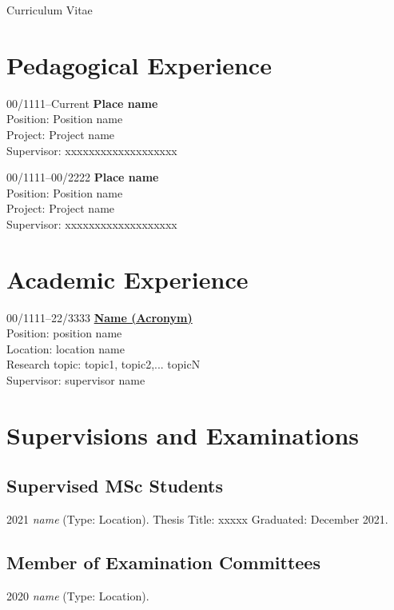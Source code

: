 \documentclass[11pt,a4paper]{article}
\begin{document}
\begin{cv}{Curriculum Vitae}
 \section{Pedagogical Experience}
  \begin{cvlist}{}
      \item[00/1111--Current]
      {\textbf{Place name}}\\
      {Position:} Position name\\
      {Project:} Project name\\
      {Supervisor:} {xxxxxxxxxxxxxxxxxxx}
    \item[00/1111--00/2222]
      {\textbf{Place name}}\\
      {Position:} Position name\\
      {Project:} Project name\\
      {Supervisor:} {xxxxxxxxxxxxxxxxxxx}
\end{cvlist}

\section{Academic Experience}
\begin{cvlist}{}
    \item[00/1111--22/3333]
        \href{about:blank}{\textbf{Name (Acronym)}}\\ 
        {Position:} {position name} \\
        {Location:} location name\\
        {Research topic:} topic1, topic2,... topicN\\
        {Supervisor:} supervisor name
  \end{cvlist}

\section{Supervisions and Examinations}
\subsection{Supervised MSc Students}
\begin{cvlist}{}
    \item[2021]
    {\em name}
    (Type: Location).
    Thesis Title: xxxxx
    Graduated: December 2021.

\end{cvlist}
\subsection{Member of Examination Committees}
\begin{cvlist}{}
    \item[2020]
    {\em name}
    (Type: Location).
    

\end{cvlist}
\end{cv}
\end{document}
